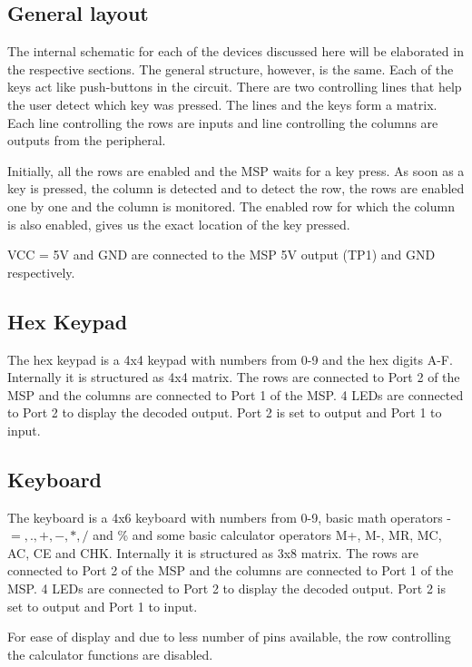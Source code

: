 \documentclass[12pt, letterpaper]{article}
\begin{document}
\subsection{General layout}

The internal schematic for each of the devices discussed here will be elaborated in the respective sections. The general structure, however, is the same. Each of the keys act like push-buttons in the circuit. There are two controlling lines that help the user detect which key was pressed. The lines and the keys form a matrix. Each line controlling the rows are inputs and line controlling the columns are outputs from the peripheral. 

Initially, all the rows are enabled and the MSP waits for a key press. As soon as a key is pressed, the column is detected and to detect the row, the rows are enabled one by one and the column is monitored. The enabled row for which the column is also enabled, gives us the exact location of the key pressed.

VCC = 5V and GND are connected to the MSP 5V output (TP1) and GND respectively.  

\subsection{Hex Keypad}

The hex keypad is a 4x4 keypad with numbers from 0-9 and the hex digits A-F. Internally it is structured as 4x4 matrix. The rows are connected to Port 2 of the MSP and the columns are connected to Port 1 of the MSP. 4 LEDs are connected to Port 2 to display the decoded output. Port 2 is set to output and Port 1 to input. 

\subsection{Keyboard}

The keyboard is a 4x6 keyboard with numbers from 0-9, basic math operators - $ =, ., +, -, *, / $ and \% and some basic calculator operators M+, M-, MR, MC, AC, CE and CHK. Internally it is structured as 3x8 matrix. The rows are connected to Port 2 of the MSP and the columns are connected to Port 1 of the MSP. 4 LEDs are connected to Port 2 to display the decoded output. Port 2 is set to output and Port 1 to input. 

For ease of display and due to less number of pins available, the row controlling the calculator functions are disabled. 
\end{document}

